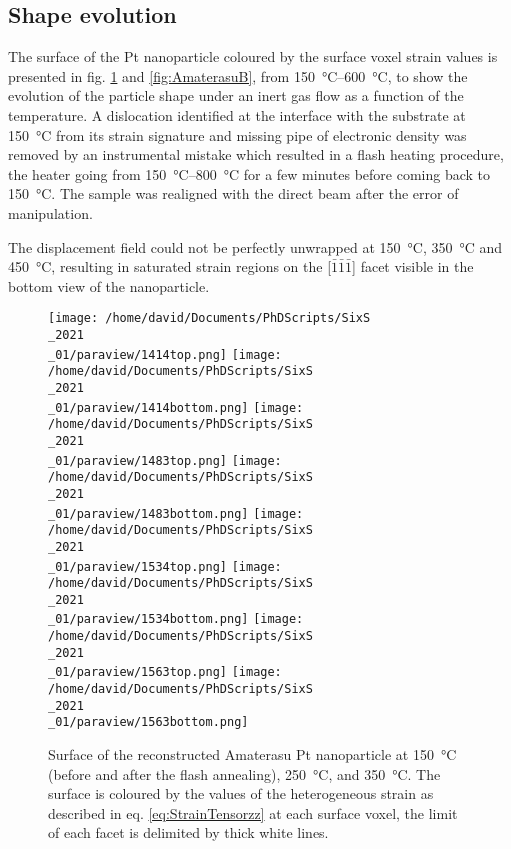 \subsection{Shape evolution}

The surface of the Pt nanoparticle coloured by the surface voxel strain values is presented in fig. \ref{fig:AmaterasuA} and \ref{fig:AmaterasuB}, from \qtyrange{150}{600}{\degreeCelsius}, to show the evolution of the particle shape under an inert gas flow as a function of the temperature.
A dislocation identified at the interface with the substrate at \qty{150}{\degreeCelsius} from its strain signature and missing pipe of electronic density \parencite{Dupraz2015} was removed by an instrumental mistake which resulted in a flash heating procedure, the heater going from \qtyrange{150}{800}{\degreeCelsius} for a few minutes before coming back to \qty{150}{\degreeCelsius}.
The sample was realigned with the direct beam after the error of manipulation.

The displacement field could not be perfectly unwrapped at \qty{150}{\degreeCelsius}, \qty{350}{\degreeCelsius} and \qty{450}{\degreeCelsius}, resulting in saturated strain regions on the [$\bar{1}\bar{1}\bar{1}$] facet visible in the bottom view of the nanoparticle.

\begin{figure}[!htb]
    \centering
    \texttt{[image: /home/david/Documents/PhDScripts/SixS\\\_2021\\\_01/paraview/1414top.png]}
    \texttt{[image: /home/david/Documents/PhDScripts/SixS\\\_2021\\\_01/paraview/1414bottom.png]}
    \texttt{[image: /home/david/Documents/PhDScripts/SixS\\\_2021\\\_01/paraview/1483top.png]}
    \texttt{[image: /home/david/Documents/PhDScripts/SixS\\\_2021\\\_01/paraview/1483bottom.png]}
    \texttt{[image: /home/david/Documents/PhDScripts/SixS\\\_2021\\\_01/paraview/1534top.png]}
    \texttt{[image: /home/david/Documents/PhDScripts/SixS\\\_2021\\\_01/paraview/1534bottom.png]}
    \texttt{[image: /home/david/Documents/PhDScripts/SixS\\\_2021\\\_01/paraview/1563top.png]}
    \texttt{[image: /home/david/Documents/PhDScripts/SixS\\\_2021\\\_01/paraview/1563bottom.png]}
    \caption{
        Surface of the reconstructed Amaterasu Pt nanoparticle at \qty{150}{\degreeCelsius} (before and after the flash annealing), \qty{250}{\degreeCelsius}, and \qty{350}{\degreeCelsius}.
        The surface is coloured by the values of the heterogeneous strain as described in eq. \ref{eq:StrainTensorzz} at each surface voxel, the limit of each facet is delimited by thick white lines.
    }
    \label{fig:AmaterasuA}
\end{figure}

